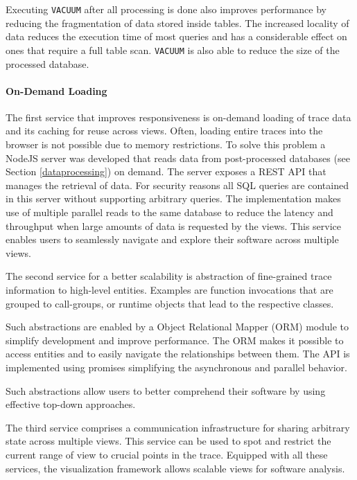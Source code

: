 Executing \texttt{VACUUM} after all processing is done also improves
performance by reducing the fragmentation of data stored inside tables. The
increased locality of data reduces the execution time of most queries and has a
considerable effect on ones that require a full table scan. \texttt{VACUUM} is
also able to reduce the size of the processed
database.

\paragraph{On-Demand Loading}
The first service that improves responsiveness is on-demand loading of trace
data and its caching for reuse across views. Often, loading entire traces
into the browser is not possible due to memory restrictions. To solve this
problem a NodeJS server was developed that reads data from post-processed 
databases (see Section \ref{dataprocessing}) on demand. The server exposes a
REST \cite{rest} API that manages the retrieval of data. For security reasons
all SQL queries are contained in this server without supporting arbitrary
queries. The implementation makes use of multiple parallel reads to the same
database to reduce the latency and throughput when large amounts of data is
requested by the views. This service enables users to seamlessly navigate and
explore their software across multiple views.

The second service for a better scalability is abstraction of fine-grained
trace information to high-level entities. Examples are function invocations
that are grouped to call-groups, or runtime objects that lead to the
respective classes. 

Such abstractions are enabled by a Object Relational Mapper
(ORM) module to simplify development and improve performance. The ORM makes it
possible to access entities and to easily navigate the relationships
between them. The API is implemented using promises \cite{promises} simplifying
the asynchronous and parallel behavior. 

Such abstractions allow users to better comprehend their
software by using effective top-down approaches. 


The third service comprises a
communication infrastructure for
sharing arbitrary state across multiple views. This service can be used to spot
and restrict the current range of view to crucial points in the trace. Equipped
with all these services, the visualization framework allows scalable views for
software analysis.


